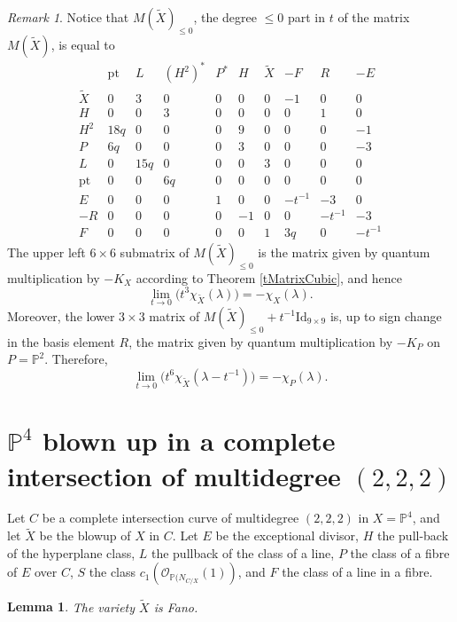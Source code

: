 \documentclass[11pt]{amsart}
\theoremstyle{plain}
\newtheorem{lemma}[theorem]{Lemma}
\numberwithin{equation}{section}
\theoremstyle{definition}
\theoremstyle{remark}
\newtheorem{remark}[theorem]{Remark}
\renewcommand{\P}{\mathbb P}
\begin{document}
\begin{remark}
Notice that $M(\widetilde{X})_{\le 0}$, the degree $\le 0$ part in $t$  of the matrix $M(\widetilde{X})$,  is equal to
\[
\renewcommand{\arraystretch}{1.2}
\begin{array}{c|cccccc|ccc}
      & \mathrm{pt} & L & (H^2)^* & P^* & H & \widetilde{X} & -F & R & -E  \\ \hline
\widetilde{X} & 0 & 3 & 0 & 0 & 0 & 0 & -1 & 0 & 0 \\
H             & 0 & 0 & 3 & 0 & 0 & 0 & 0 & 1 & 0 \\
H^2           & 18q & 0 & 0 & 0 & 9 & 0 & 0 & 0 & -1 \\
P             & 6q & 0 & 0 & 0 & 3 & 0 & 0 & 0 & -3 \\
L             & 0 & 15q & 0 & 0 & 0 & 3 & 0 & 0 & 0 \\
\mathrm{pt}   & 0 & 0 & 6q & 0 & 0 & 0 & 0 & 0 & 0 \\ \hline
E             & 0 & 0 & 0 & 1 & 0 & 0 & -t^{-1} & -3 & 0 \\
-R            & 0 & 0 & 0 & 0 & -1 & 0 & 0 & -t^{-1} & -3 \\
F             & 0 & 0 & 0 & 0 & 0 & 1 & 3q & 0 & -t^{-1}
\end{array}
\]
The upper left $6\times 6$ submatrix of $M(\widetilde{X})_{\le 0}$ is the matrix given by quantum multiplication by $-K_X$ according to Theorem \ref{tMatrixCubic}, and hence 
\[
\lim_{t\to 0} \bigl( t^3 \chi_{\widetilde{X}}(\lambda) \bigr) = -\chi_X (\lambda) .
\]
Moreover, the lower $3\times 3$ matrix of $M(\widetilde{X})_{\le 0} + t^{-1} \mathrm{Id}_{9\times 9}$ is, up to sign change in the basis element $R$, the matrix given by quantum multiplication by $-K_P$ on $P=\P^2$. Therefore, 
\[
\lim_{t\to 0} \bigl( t^6 \chi_{\widetilde{X}} (\lambda - t^{-1}) \bigr) = -\chi_P (\lambda ). 
\]
\end{remark}










\section{$\P^4$ blown up in a complete intersection of multidegree $(2,2,2)$}\label{sP4BlownUp}

Let $C$ be a complete intersection curve of multidegree $(2,2,2)$ in $X=\P^4$, and let $\widetilde{X}$ be the blowup of $X$ in $C$. Let $E$ be the exceptional divisor, $H$ the pull-back of the hyperplane class, $L$ the pullback of the class of a line, $P$ the class of a fibre of $E$ over $C$, $S$ the class $c_1(\mathcal{O}_{\P (N_{C/X}}(1))$, and $F$ the class of a line in a fibre. 
\begin{lemma}\label{lXFano}
The variety $\widetilde{X}$ is Fano.
\end{lemma}
\end{document}

